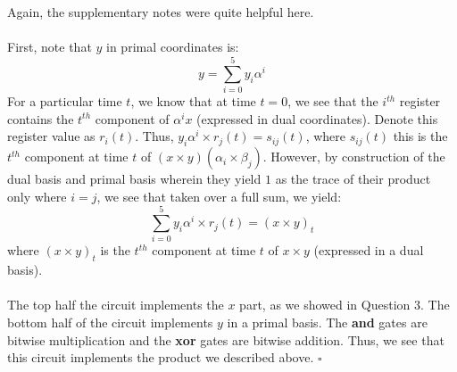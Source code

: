 \documentclass[letterpaper]{article}
\newcommand*{\QED}{\hfill\ensuremath{\square}}%
\begin{document}
\section{}
\label{sec:Question4}
Again, the supplementary notes were quite helpful here.
\\ \\
First, note that $ y $ in primal coordinates is:
\[
y = \sum_{i = 0}^{5} y_i \alpha^{i}
\]
For a particular time $ t $, we know that at time $ t = 0 $, we see that the $ i^{th} $ register contains the $ t^{th} $ component of $ \alpha^i x $ (expressed in dual coordinates).
Denote this register value as $ r_i(t) $.
Thus, $ y_i \alpha^{i} \times r_j(t) = s_{ij}(t) $, where $ s_{ij}(t) $ this is the $ t^{th} $ component at time $ t $ of $ (x \times y)(\alpha_i \times \beta_j) $.
However, by construction of the dual basis and primal basis wherein they yield $ 1 $ as the trace of their product only where $ i = j $, we see that taken over a full sum, we yield:
\[
\sum_{i = 0}^{5} y_i \alpha^{i} \times r_j(t) = {(x \times y)}_t
\]
where $ {(x \times y)}_t $ is the $ t^{th} $ component at time $ t $ of $ x \times y $ (expressed in a dual basis).
\\ \\
The top half the circuit implements the $ x $ part, as we showed in Question 3.
The bottom half of the circuit implements $ y $ in a primal basis.
The \textbf{and} gates are bitwise multiplication and the \textbf{xor} gates are bitwise addition.
Thus, we see that this circuit implements the product we described above.
\QED{}

\section{}
\label{sec:Question5}
\end{document}
